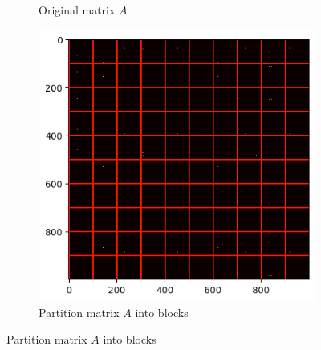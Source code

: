 \documentclass{beamer}
\begin{document}
\begin{frame}
\begin{columns}
\begin{column}{0.5\textwidth}
\begin{figure}[htb]
\begin{subfigure}[b]{\textwidth}
                    \caption{Original matrix $A$}
                    \label{fig:image1}
                \end{subfigure}
                \begin{subfigure}[b]{\textwidth}
                    \centering
                    \includegraphics[width=0.6\linewidth]{partition.png}
                    \caption{Partition matrix $A$ into blocks}
                    \label{fig:image2}
                \end{subfigure}
                \vspace{-0.8cm}
            \end{figure}
        \end{column}
    \end{columns}
\end{frame}
\end{document}
